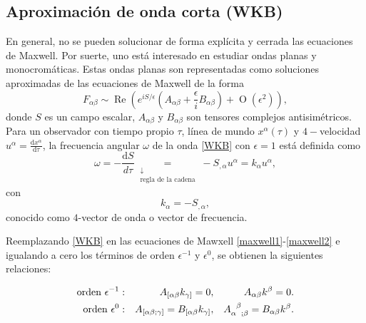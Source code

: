 \subsection{Aproximación de onda corta (WKB)}
En general, no se pueden solucionar de forma explícita y cerrada las ecuaciones de Maxwell. Por suerte, uno está interesado en estudiar ondas planas y monocromáticas. Estas ondas planas son representadas como soluciones aproximadas de las ecuaciones de Maxwell de la forma
\begin{equation}\label{WKB}
	F_{\alpha\beta}\sim \mathop{Re}\left( e^{iS/\epsilon}\left( A_{\alpha\beta}+\frac{\epsilon}{i}B_{\alpha\beta} \right)+\mathop{O}(\epsilon^2)\right),
\end{equation}
donde $S$ es un campo escalar, $A_{\alpha\beta}$ y $B_{\alpha\beta}$ son tensores complejos antisimétricos. Para un observador con tiempo propio $\tau$, línea de mundo $x^\alpha(\tau)$ y $4-$velocidad $u^\alpha=\frac{\mathrm{d}x^\alpha}{\mathrm{d}\tau}$, la frecuencia angular $\omega$ de la onda \eqref{WKB} con $\epsilon=1$ está definida como
\begin{equation}\label{omegaDefinition}
	\omega=-\frac{\mathrm{d}S}{d\tau}\underset{\substack{\downarrow \\ \text{regla de la cadena}}}{=}-S_{,\alpha}u^\alpha = k_\alpha u^\alpha,
\end{equation}
con
\begin{equation}
	k_\alpha=-S_{,\alpha},
\end{equation}
conocido como $4$-vector de onda o vector de frecuencia.

Reemplazando \eqref{WKB} en las ecuaciones de Mawxell \eqref{maxwell1}-\eqref{maxwell2} e igualando a cero los términos de orden $\epsilon^{-1}$ y $\epsilon^{0}$, se obtienen la siguientes relaciones:

\begin{align}
\label{firstWKB}
\text{orden }\epsilon^{-1}: & & A_{[\alpha\beta}k_{\gamma]}=0, & & A_{\alpha\beta}k^\beta=0. \\
\label{secondWKB}
\text{orden }\epsilon^{0}: & & A_{[\alpha\beta;\gamma]}=B_{[\alpha\beta}k_{\gamma]}, & & A\indices{_\alpha^\beta_{;\beta}}=B_{\alpha\beta}k^\beta.
\end{align}
